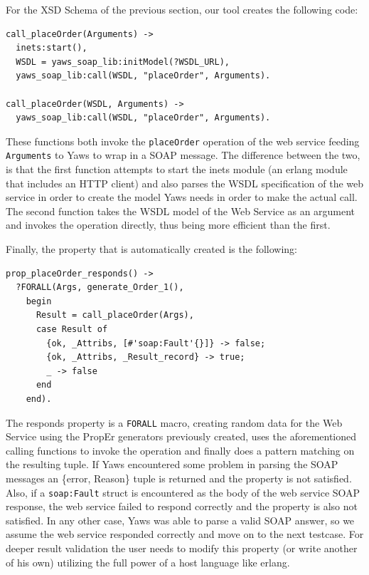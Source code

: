 \documentclass[submission,copyright,a4]{eptcs}
\begin{document}
For the XSD Schema of the previous section, our tool creates the following code:

\begin{lstlisting}
call_placeOrder(Arguments) ->
  inets:start(),
  WSDL = yaws_soap_lib:initModel(?WSDL_URL),
  yaws_soap_lib:call(WSDL, "placeOrder", Arguments).
    
call_placeOrder(WSDL, Arguments) ->
  yaws_soap_lib:call(WSDL, "placeOrder", Arguments).
\end{lstlisting}

These functions both invoke the \texttt{placeOrder} operation of the web service feeding 
\texttt{Arguments} to Yaws to wrap in a SOAP message. The difference between the two, is 
that the first function attempts to start the inets module (an erlang module that includes 
an HTTP client) and also parses the WSDL specification of the web service in order to create 
the model Yaws needs in order to make the actual call. The second function takes the WSDL 
model of the Web Service as an argument and invokes the operation directly, thus being more 
efficient than the first.

Finally, the property that is automatically created is the following:

\begin{lstlisting}
prop_placeOrder_responds() ->
  ?FORALL(Args, generate_Order_1(),
    begin
      Result = call_placeOrder(Args),
      case Result of 
        {ok, _Attribs, [#'soap:Fault'{}]} -> false;
        {ok, _Attribs, _Result_record} -> true;
        _ -> false
      end
    end).
\end{lstlisting}

The responds property is a \texttt{FORALL} macro, creating random data for the Web Service using 
the PropEr generators previously created, uses the aforementioned calling functions to 
invoke the operation and finally does a pattern matching on the resulting tuple. If Yaws 
encountered some problem in parsing the SOAP messages an \{error, Reason\} tuple is returned
and the property is not satisfied. Also, if a \texttt{soap:Fault} struct is encountered as the 
body of the web service SOAP response, the web service failed to respond correctly and the 
property is also not satisfied. In any other case, Yaws was able to parse a valid SOAP answer, 
so we assume the web service responded correctly and move on to the next testcase. For deeper
result validation the user needs to modify this property (or write another of his own) utilizing
the full power of a host language like erlang.
\end{document}
